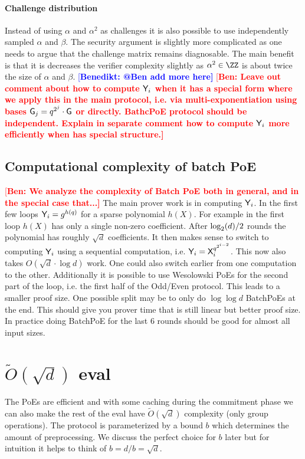 \documentclass[12pt]{article}
\theoremstyle{Definition}
\newcommand{\ben}[1]{{\textcolor{red}{[\bf Ben: #1]}}}
\newcommand{\benedikt}[1]{{\textcolor{blue}{[\bf Benedikt: #1]}}}
\newcommand{\ben}[1]{}
\begin{document}
\paragraph{Challenge distribution}
Instead of using $\alpha$ and $\alpha^2$ as challenges it is also possible to use independently sampled $\alpha$ and $\beta$. The security argument is slightly more complicated as one needs to argue that the challenge matrix remains diagnosable. The main benefit is that it is decreases the verifier complexity slightly as $\alpha^2 \in \ZZ$ is about twice the size of $\alpha$ and $\beta$. \benedikt{@Ben add more here}
\ben{Leave out comment about how to compute $\mathsf{Y}_i$ when it has a special form where we apply this in the main protocol, i.e. via multi-exponentiation using bases $\mathsf{G}_j=q^{ 2^{j}} \cdot \mathsf{G}$ or directly. BathcPoE protocol should be independent. Explain in separate comment how to compute $\mathsf{Y}_i$ more efficiently when has special structure.}

\subsection{Computational complexity of batch PoE}
\ben{We analyze the complexity of Batch PoE both in general, and in the special case that...} The main prover work is in computing $\mathsf{Y}_i$. In the first few loops $\mathsf{Y}_i=g^{h(q)}$ for a sparse polynomial $h(X)$. For example in the first loop $h(X)$ has only a single non-zero coefficient.
After $\log_2(d)/2$ rounds the polynomial has roughly $\sqrt{d}$ coefficients. It then makes sense to switch to computing $\mathsf{Y}_i$ using a sequential computation, i.e. $\mathsf{Y}_i=\mathsf{X}_i^{q^{2^{i-2}}}$. This now also takes $O(\sqrt{d}\cdot \log{d})$ work. One could also switch earlier from one computation to the other. Additionally it is possible to use Wesolowski PoEs for the second part of the loop, i.e. the first half of the Odd/Even protocol. This leads to a smaller proof size. One possible split may be to only do $\log{\log{d}}$ BatchPoEs at the end. This should give you prover time that is still linear but better proof size. In practice doing BatchPoE for the last $6$ rounds should be good for almost all input sizes.
\section{$\tilde{O}(\sqrt{d})$ eval}
The PoEs are efficient and with some caching during the commitment phase we can also make the rest of the eval have $\tilde{O}(\sqrt{d})$ complexity (only group operations). The protocol is parameterized by a bound $b$ which determines the amount of preprocessing. We discuss the perfect choice for $b$ later but for intuition it helps to think of $b=d/b=\sqrt{d}$.
\end{document}
